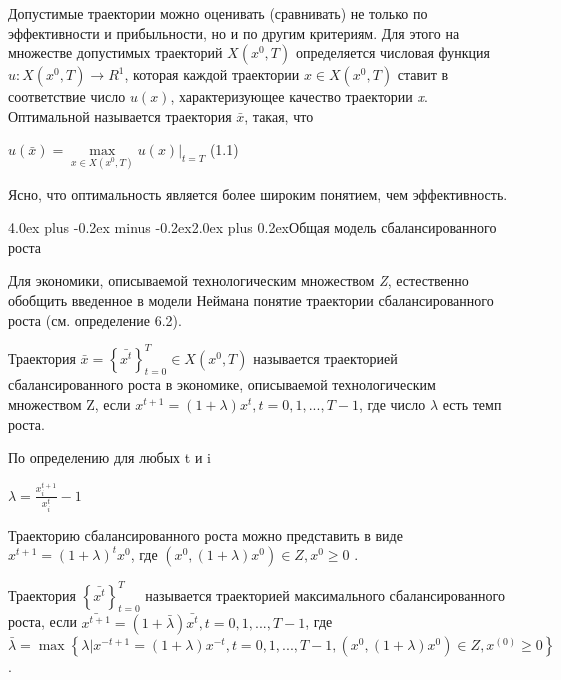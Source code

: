 \documentclass[12pt, 4paper]{book}
\makeatletter
\renewcommand{\section}{\@startsection{section}{1}{1pt}%
	{4.0ex plus -0.2ex minus -0.2ex}{2.0ex plus 0.2ex}{\centering\bf}}%
\makeatother
\begin{document}
{Допустимые траектории можно оценивать (сравнивать) не только по эффективности и прибыльности, но и по другим критериям. Для этого на множестве допустимых траекторий $X(x^0,T)$ определяется числовая функция $u:X(x^0,T) \rightarrow R^1$, которая каждой траектории $x \in X(x^0,T)$ ставит в соответствие число $u(x)$, характеризующее качество траектории \textit{x}. Оптимальной называется траектория $\bar{x}$, такая, что
\begin{center}
$u(\bar{x})=\max\limits_{x \in X(x^0,T)} u(x)|_{t=T}$ (1.1)
\end{center}
\par
 
Ясно, что оптимальность является более широким понятием, чем эффективность.
\newpage
\begin{center}
\section{Общая модель сбалансированного роста}
\end{center}
\par
 
Для экономики, описываемой технологическим множеством \textit{Z}, естественно обобщить введенное в модели Неймана понятие траектории сбалансированного роста (см. определение 6.2).
\par
 
Траектория $\bar{x}=\left\{\bar{x^t}\right\}_{t=0}^{T} \in X(x^0,T)$ называется траекторией сбалансированного роста в экономике, описываемой технологическим множеством Z, если $x^{t+1}=(1+ \lambda)x^t, t=0,1,...,T-1$, где число $\lambda$ есть темп роста.
\par
 
По определению для любых t и i
\begin{center}
$\lambda = \frac{x_{i}^{t+1}}{x_{i}^t} - 1$
\end{center}
\par

Траекторию сбалансированного роста можно представить в виде $x^{t+1}=(1 + \lambda)^t x^0$, где $(x^0,(1+ \lambda)x^0)\in Z, x^0 \geq 0$ .
\par

Траектория $\left\{\bar{x^t}\right\}_{t=0}^{T}$ называется траекторией максимального сбалансированного роста, если $\bar{x^{t+1}} = (1 + \bar{\lambda})\bar{x^t},t=0,1,...,T-1 $, где $\bar{\lambda} = \max \left\{\lambda |x^{-t+1} = (1+ \lambda)x^{-t}, t=0,1,...,T-1, (x^0,(1+\lambda )x^{0}) \in Z,x^(0) \geq 0 \right\}$.
\par

}
\end{document}
